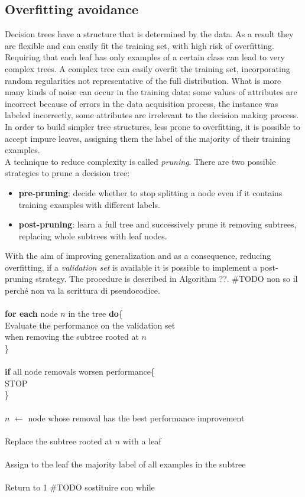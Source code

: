 \subsection{Overfitting avoidance}
Decision trees have a structure that is determined by the data. As a result they are flexible and can easily fit the training set, with high risk of
overfitting.\\
Requiring that each leaf has only examples of a certain class can lead to very complex trees. A complex tree can easily overfit the training set, incorporating random regularities not representative of the full distribution. What is more many kinds of noise can occur in the training data: some values of attributes are incorrect because of errors in the data acquisition process, the instance was labeled incorrectly, some attributes are irrelevant to the decision making process. In order to build simpler tree structures, less prone to overfitting, it is possible to accept impure leaves, assigning them the label of the majority of their training examples.\\
A technique to reduce complexity is called \textit{pruning}. There are two possible strategies to prune a decision tree:
\begin{itemize}
    \item \textbf{pre-pruning}: decide whether to stop splitting a node even if it contains training examples with different labels.
    \item \textbf{post-pruning}: learn a full tree and successively prune it removing subtrees, replacing whole subtrees with leaf nodes.
\end{itemize}

With the aim of improving generalization and as a consequence, reducing overfitting, if a \textit{validation set} is available it is possible to implement a post-pruning strategy. The procedure is described in Algorithm ??.
\#TODO non so il perché non va la scrittura di pseudocodice.\\\\
\textbf{for each} node $n$ in the tree \textbf{do}\{\\
\tab Evaluate the performance on the validation set\\
\tab when removing the subtree rooted at $n$\\
\}\\\\
\textbf{if} all node removals worsen performance\{\\
\tab STOP\\
\}\\\\
$n$ $\leftarrow$ node whose removal has the best performance improvement\\\\
Replace the subtree rooted at $n$ with a leaf\\\\
Assign to the leaf the majority label of all examples in the subtree\\\\
Return to 1 \#TODO sostituire con while

